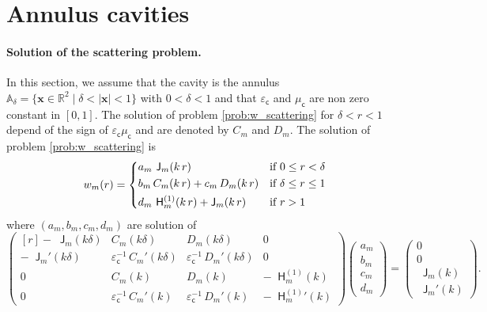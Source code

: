 \documentclass[12pt,a4paper]{article}
\newcommand{\bbA}{\mathbb{A}}
\newcommand{\bbR}{\mathbb{R}}
\newcommand{\bJ}{\mathop{}\!\mathsf{J}}
\newcommand{\Hu}{\mathop{}\!\mathsf{H}^{(1)}}
\newcommand{\vx}{\boldsymbol{x}}
\newcommand{\ecav}{\varepsilon_\mathsf{c}}
\newcommand{\mcav}{\mu_\mathsf{c}}
\begin{document}
\section{Annulus cavities}

\paragraph{Solution of the scattering problem.}
In this section, we assume that the cavity is the annulus $\bbA_\delta = \{\vx \in \bbR^2 \mid \delta < |\vx| < 1\}$ with $0 < \delta < 1$ and that $\ecav$ and $\mcav$ are non zero constant in $[0, 1]$.
The solution of problem \eqref{prob:w_scattering} for $\delta < r < 1$ depend of the sign of $\ecav\mcav$ and are denoted by $C_m$ and $D_m$.
The solution of problem \eqref{prob:w_scattering} is
\begin{equation}
    w_m(r) = \begin{dcases}
        a_m\, \bJ_m(k\, r) & \text{if } 0 \le r < \delta\\
        b_m\, C_m(k\, r) + c_m\, D_m(k\, r) & \text{if } \delta \le r \le 1\\
        d_m\, \Hu_m(k\, r) + \bJ_m(k\, r) & \text{if } r > 1
    \end{dcases}
\end{equation}
where $(a_m, b_m, c_m, d_m)$ are solution of
\begin{equation}
    \begin{pmatrix*}[r]
        -\bJ_m(k\delta) & C_m(k\delta) & D_m(k\delta) & 0\\[1ex]
        -\bJ_m'(k\delta) & \ecav^{-1}\, C_m'(k\delta) & \ecav^{-1}\, D_m'(k\delta) & 0\\[1ex]
        0 & C_m(k) & D_m(k) & -\Hu_m(k)\\[1ex]
        0 & \ecav^{-1}\, C_m'(k) & \ecav^{-1}\, D_m'(k) & -{\Hu_m}'(k)
    \end{pmatrix*}
    \begin{pmatrix}
        a_m\\[1ex]
        b_m\\[1ex]
        c_m\\[1ex]
        d_m
    \end{pmatrix} = 
    \begin{pmatrix}
        0\\[1ex]
        0\\[1ex]
        \bJ_m(k)\\[1ex]
        \bJ_m'(k)
    \end{pmatrix}.
\end{equation}
\end{document}
